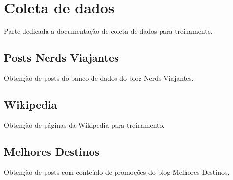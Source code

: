 \section{Coleta de dados}

Parte dedicada a documentação de coleta de dados para treinamento.

\subsection{Posts Nerds Viajantes}

Obtenção de posts do banco de dados do blog Nerds Viajantes.

\subsection{Wikipedia}

Obtenção de páginas da Wikipedia para treinamento.

\subsection{Melhores Destinos}

Obtenção de posts com conteúdo de promoções do blog Melhores Destinos.